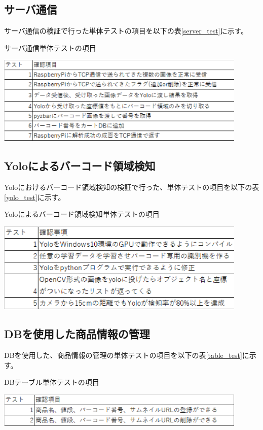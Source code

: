 \subsection*{サーバ通信}
サーバ通信の検証で行った単体テストの項目を以下の表\ref{server_test}に示す。
\begin{table}[htbp]
\centering
\caption{サーバ通信単体テストの項目}
\includegraphics[width=12cm]{./pic/server_test.eps}
\label{server_test}
\end{table}

\subsection*{Yoloによるバーコード領域検知}
Yoloにおけるバーコード領域検知の検証で行った、単体テストの項目を以下の表\ref{yolo_test}に示す。
\begin{table}[htbp]
\centering
\caption{Yoloによるバーコード領域検知単体テストの項目}
\includegraphics[width=12cm]{./pic/yolo_test.eps}
\label{yolo_test}
\end{table}

\subsection*{DBを使用した商品情報の管理}
DBを使用した、商品情報の管理の単体テストの項目を以下の表\ref{table_test}に示す。

\begin{table}[htbp]
\centering
\caption{DBテーブル単体テストの項目}
\includegraphics[width=12cm]{./pic/table_test.eps}
\label{table_test}
\end{table}


